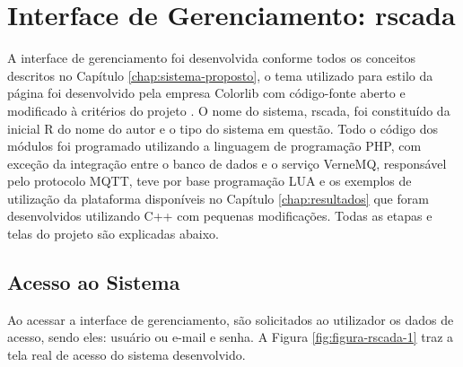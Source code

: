 \chapter{Interface de Gerenciamento: rscada}
\label{chap:interface-web}

A interface de gerenciamento foi desenvolvida conforme todos os conceitos descritos no Capítulo \ref{chap:sistema-proposto}, o tema utilizado para estilo da página foi desenvolvido pela empresa Colorlib com código-fonte aberto e modificado à critérios do projeto \cite{Concept}. O nome do sistema, rscada,  foi constituído da inicial R do nome do autor e o tipo do sistema em questão. Todo o código dos módulos foi programado utilizando a linguagem de programação PHP, com exceção da integração entre o banco de dados e o serviço VerneMQ, responsável pelo protocolo MQTT, teve por base programação LUA e os exemplos de utilização da plataforma disponíveis no Capítulo \ref{chap:resultados} que foram desenvolvidos utilizando C++ com pequenas modificações. Todas as etapas e telas do projeto são explicadas abaixo.

\section{Acesso ao Sistema}
\label{sec:acesso-sistema}
Ao acessar a interface de gerenciamento, são solicitados ao utilizador os dados de acesso, sendo eles: usuário ou e-mail e senha. A Figura \ref{fig:figura-rscada-1} traz a tela real de acesso do sistema desenvolvido.

        \begin{figure}[!h]
    	\end{figure}

